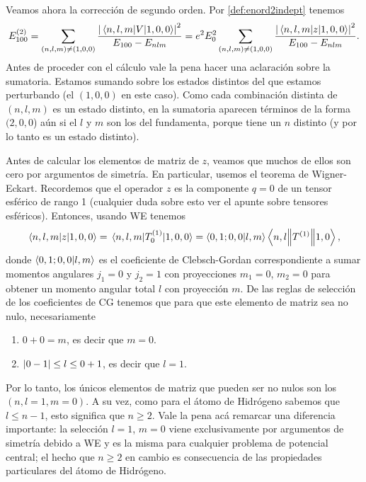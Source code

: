 \documentclass[10pt, a4paper]{article}
\numberwithin{equation}{subsection}
\begin{document}
Veamos ahora la corrección de segundo orden. Por \eqref{def:enord2indept}
tenemos
\begin{equation}
  E^{(2)}_{100}
  = \sum_{(n,l,m)\neq(1,0,0)} \frac{\abs{\matrixel{n,l,m}{V}{1,0,0}}^2}
    {E_{100} - E_{nlm}}
  = e^2E_0^2 \sum_{(n,l,m)\neq(1,0,0)}
    \frac{\abs{\matrixel{n,l,m}{z}{1,0,0}}^2} {E_{100} - E_{nlm}}.
\end{equation}
Antes de proceder con el cálculo vale la pena hacer una aclaración sobre la
sumatoria. Estamos sumando sobre los estados distintos del que estamos
perturbando (el $(1,0,0)$ en este caso). Como cada combinación distinta de
$(n,l,m)$ es un estado distinto, en la sumatoria aparecen términos de la forma
$(2,0,0$) aún si el $l$ y $m$ son los del fundamenta, porque tiene un $n$
distinto (y por lo tanto es un estado distinto).

Antes de calcular los elementos de matriz de $z$, veamos que muchos de ellos
son cero por argumentos de simetría. En particular, usemos el teorema de
Wigner-Eckart. Recordemos que el operador $z$ es la componente $q = 0$ de un
tensor esférico de rango 1 (cualquier duda sobre esto ver el apunte sobre
tensores esféricos). Entonces, usando WE tenemos
\begin{equation}
  \matrixel{n,l,m}{z}{1,0,0}
  = \matrixel{n,l,m}{T^{(1)}_{0}}{1,0,0}
  = \braket{0,1;0,0}{l,m} \doublebarmel{n,l}{T^{(1)}}{1,0},
\end{equation}
donde $\braket{0,1;0,0}{l,m}$ es el coeficiente de Clebsch-Gordan
correspondiente a sumar momentos angulares $j_1 = 0$ y $j_2 = 1$ con
proyecciones $m_1 = 0$, $m_2 = 0$ para obtener un momento angular total $l$ con
proyección $m$. De las reglas de selección de los coeficientes de CG tenemos
que para que este elemento de matriz sea no nulo, necesariamente
\begin{enumerate}[label=(\alph*)]
  \item $0 + 0 = m$, es decir que $m = 0$.
  \item $\abs{0 - 1} \leq l \leq {0 + 1}$, es decir que $l = 1$.
\end{enumerate}
Por lo tanto, los únicos elementos de matriz que pueden ser no nulos son los
$(n,l=1,m=0)$. A su vez, como para el átomo de Hidrógeno sabemos que $l \leq
n-1$, esto significa que $n \geq 2$. Vale la pena acá remarcar una diferencia
importante: la selección $l=1$, $m=0$ viene exclusivamente por argumentos de
simetría debido a WE y es la misma para cualquier problema de potencial
central; el hecho que $n \geq 2$ en cambio es consecuencia de las propiedades
particulares del átomo de Hidrógeno.
\end{document}
